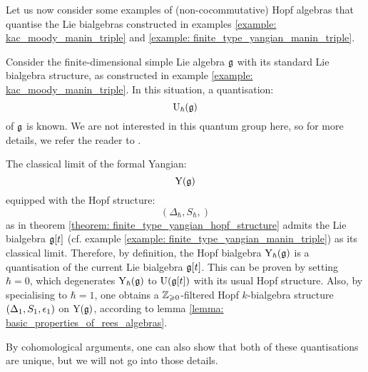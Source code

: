         Let us now consider some examples of (non-cocommutative) Hopf algebras that quantise the Lie bialgebras constructed in examples \ref{example: kac_moody_manin_triple} and \ref{example: finite_type_yangian_manin_triple}.
        \begin{example} \label{example: finite_type_QUEs}
            Consider the finite-dimensional simple Lie algebra $\mathfrak{g}$ with its standard Lie bialgebra structure, as constructed in example \ref{example: kac_moody_manin_triple}. In this situation, a quantisation:
                $$\mathrm{U}_{\hbar}(\mathfrak{g})$$
            of $\mathfrak{g}$ is known. We are not interested in this quantum group here, so for more details, we refer the reader to \cite[Section XVII.2]{kassel_quantum_groups}. 
        \end{example}
        \begin{example} \label{example: finite_type_yangians}
            The classical limit of the formal Yangian:
                $$\mathrm{Y}(\mathfrak{g})$$
            equipped with the Hopf structure:
                $$(\Delta_{\hbar}, S_{\hbar}, )$$
            as in theorem \ref{theorem: finite_type_yangian_hopf_structure} admits the Lie bialgebra $\mathfrak{g}[t]$ (cf. example \ref{example: finite_type_yangian_manin_triple}) as its classical limit. Therefore, by definition, the Hopf bialgebra $\mathrm{Y}_{\hbar}(\mathfrak{g})$ is a quantisation of the current Lie bialgebra $\mathfrak{g}[t]$. This can be proven by setting $\hbar = 0$, which degenerates $\mathrm{Y}_{\hbar}(\mathfrak{g})$ to $\mathrm{U}(\mathfrak{g}[t])$ with its usual Hopf structure. Also, by specialising to $\hbar = 1$, one obtains a $\mathbb{Z}_{\geqslant 0}$-filtered Hopf $k$-bialgebra structure $(\Delta_1, S_1, \epsilon_1)$ on $\mathrm{Y}(\mathfrak{g})$, according to lemma \ref{lemma: basic_properties_of_rees_algebras}.
        \end{example}
        By cohomological arguments, one can also show that both of these quantisations are unique, but we will not go into those details.


